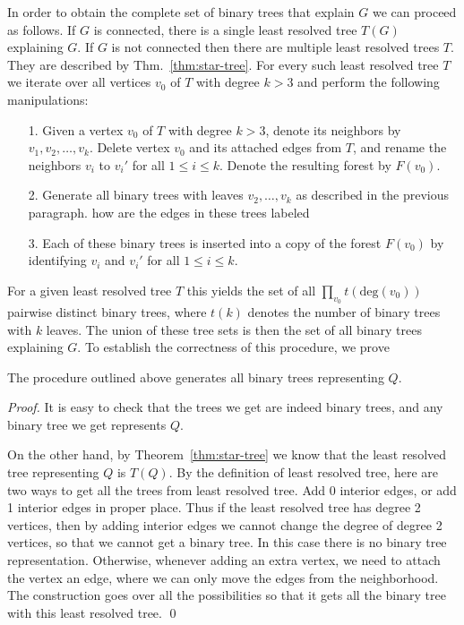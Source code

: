 \documentclass[smallextended]{svjour3}
\newcommand{\rev}[1]{\begingroup\color{blue}#1\endgroup}
\newcommand{\TODO}[1]{\begingroup\color{red}#1\endgroup}
\begin{document}
  In order to obtain the complete set of binary trees that explain
  $G$ we can proceed as follows. If $G$ is connected, there is a single
  least resolved tree $T(G)$ explaining $G$. If $G$ is not connected then
  there are multiple least resolved trees $T$. They are described by
  Thm.~\ref{thm:star-tree}. For every such least resolved tree $T$ we
  iterate over all vertices $v_0$ of $T$ with degree $k>3$ and perform the
  following manipulations:
  \begin{itemize}
  \item[{1.}] Given a vertex $v_0$ of $T$ with degree $k>3$, denote its
    neighbors by $v_1, v_2,\dots, v_k$. Delete vertex $v_0$ and its attached
    edges from $T$, and rename the neighbors $v_i$ to $v_i'$ for all $1\leq
    i\leq k$. Denote the resulting forest by $F(v_0)$.
  \item[{2.}] Generate all binary trees with leaves $v_2,\dots, v_k$ as
    described in the previous paragraph.
    \TODO{how are the edges in these trees labeled}
  \item[{3.}] Each of these binary trees is inserted into a copy of the
    forest $F(v_0)$ by \rev{identifying} $v_i$ and $v_i'$ for all $1\leq
    i\leq k$.
  \end{itemize}
  For a given least resolved tree $T$ this yields the set of all
  $\prod_{v_0} t(\mathrm{deg}(v_0))$ pairwise distinct binary trees, where
  $t(k)$ denotes the number of binary trees with $k$ leaves. The union of
  these tree sets is then the set of all binary trees explaining $G$.  To
  establish the correctness of this procedure, we prove
\newline
\begin{lemma}\label{lem:binary}
  The procedure outlined above generates all binary trees representing $Q$.
\end{lemma}
\begin{proof}
  It is easy to check that the trees we get are indeed binary trees, and
  any binary tree we get represents $Q$.
 
  On the other hand, by Theorem~\ref{thm:star-tree} we know that the least
  resolved tree representing $Q$ is $T(Q)$.  By the definition of least
  resolved tree, here are two ways to get all the trees from least resolved
  tree. Add 0 interior edges, or add 1 interior edges in proper place.
  Thus if the least resolved tree has degree 2 vertices, then by adding
  interior edges we cannot change the degree of degree 2 vertices, so that
  we cannot get a binary tree.  In this case there is no binary tree
  representation.  Otherwise, whenever adding an extra vertex, we need to
  attach the vertex an edge, where we can only move the edges from the
  neighborhood.  The construction goes over all the possibilities so that
  it gets all the binary tree with this least resolved tree. \qed
\end{proof}
\end{document}
